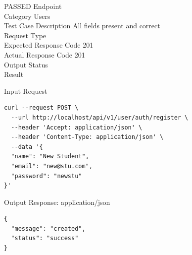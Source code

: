 \begin{testcase}{50}{PASSED}
Endpoint \hfill {}\\
Category \hfill Users\\
Test Case Description \hfill All fields present and correct\\

Request Type    \hfill {}\\
Expected Response Code    \hfill 201\\
Actual Response Code    \hfill 201\\

Output Status \hfill {}\\
Result \hfill {}

\begin{ipblock}{Input Request}
\begin{verbatim}
curl --request POST \
  --url http://localhost/api/v1/user/auth/register \
  --header 'Accept: application/json' \
  --header 'Content-Type: application/json' \
  --data '{
  "name": "New Student",
  "email": "new@stu.com",
  "password": "newstu"
}'
\end{verbatim}
\end{ipblock}

\begin{opblock}{Output Response: application/json}
\begin{verbatim}
{
  "message": "created",
  "status": "success"
}
\end{verbatim}
\end{opblock}
\end{testcase}

